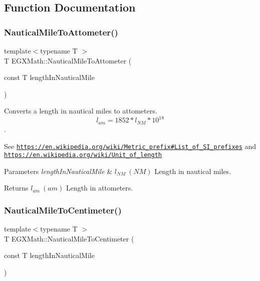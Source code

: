 \subsection{Function Documentation}
\mbox{\label{group___e_g_x_math-_conversions-_length_conversions-_nautical-_nautical_mile-_s_i_ga18a7668c4fb069dd5955fd010bff4db5}} 
\subsubsection{\texorpdfstring{Nautical\+Mile\+To\+Attometer()}{NauticalMileToAttometer()}}
{\footnotesize\ttfamily template$<$typename T $>$ \\
T E\+G\+X\+Math\+::\+Nautical\+Mile\+To\+Attometer (\begin{DoxyParamCaption}\item[{const T}]{length\+In\+Nautical\+Mile }\end{DoxyParamCaption})}



Converts a length in nautical miles to attometers. \[ l_{am}=1852 * l_{NM} * 10^{18} \]. 

See \href{https://en.wikipedia.org/wiki/Metric_prefix#List_of_SI_prefixes}{\tt https\+://en.\+wikipedia.\+org/wiki/\+Metric\+\_\+prefix\#\+List\+\_\+of\+\_\+\+S\+I\+\_\+prefixes} and \href{https://en.wikipedia.org/wiki/Unit_of_length}{\tt https\+://en.\+wikipedia.\+org/wiki/\+Unit\+\_\+of\+\_\+length} 
\begin{DoxyParams}{Parameters}
{\em length\+In\+Nautical\+Mile} & $ l_{NM}\ (NM)$ Length in nautical miles. \\
\hline
\end{DoxyParams}
\begin{DoxyReturn}{Returns}
$ l_{am}\ (am)$ Length in attometers. 
\end{DoxyReturn}
\mbox{\label{group___e_g_x_math-_conversions-_length_conversions-_nautical-_nautical_mile-_s_i_gae387f69d6b598c6f2381c33684fd9afe}} 
\subsubsection{\texorpdfstring{Nautical\+Mile\+To\+Centimeter()}{NauticalMileToCentimeter()}}
{\footnotesize\ttfamily template$<$typename T $>$ \\
T E\+G\+X\+Math\+::\+Nautical\+Mile\+To\+Centimeter (\begin{DoxyParamCaption}\item[{const T}]{length\+In\+Nautical\+Mile }\end{DoxyParamCaption})}



